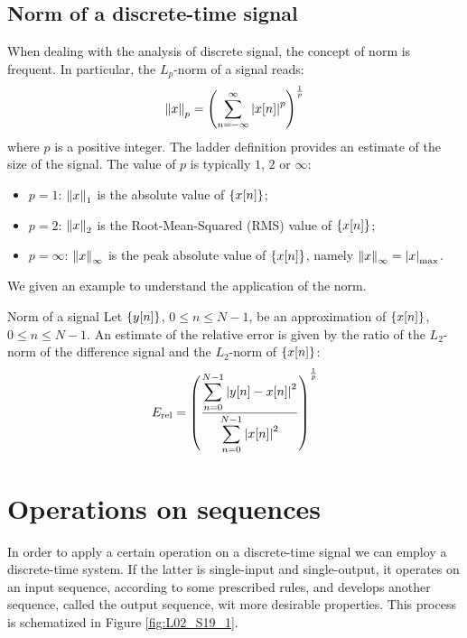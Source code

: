 \documentclass[../../main/main.tex]{subfiles}
\begin{document}
\subsection{Norm of a discrete-time signal}
When dealing with the analysis of discrete signal, the concept of norm is frequent.
In particular, the \( L_{p} \)-norm of a signal reads:
\begin{equation}
    \norm{x}_{p}
    =
    \qty(\sum_{n = -\infty}^{\infty} \abs{x[n]}^{p})^{\frac{1}{p}}
    \label{eq:L02_S17_1}
\end{equation}
where \( p \) is a positive integer. The ladder definition provides an estimate of the size of the signal. The value of \( p \) is typically \( 1 \), \( 2 \) or \( \infty \):
\begin{itemize}
    \item \( p = 1 \): \( \norm{x}_{1} \) is the absolute value of \( \qty{x[n]} \);
    \item \( p = 2 \): \( \norm{x}_{2} \) is the Root-Mean-Squared (RMS) value of \( \qty{x[n]} \);
    \item \( p = \infty \): \( \norm{x}_{\infty} \) is the peak absolute value of \( \qty{x[n]} \), namely \( \norm{x}_{\infty} = \abs{x}_{\mathrm{max}} \).
\end{itemize}
We given an example to understand the application of the norm.

\begin{example}{Norm of a signal}{}
    Let \( \qty{y[n]} \), \( 0 \le n \le N-1 \), be an approximation of \( \qty{x[n]} \), \( 0 \le n \le N-1 \).
    An estimate of the relative error is given by the ratio of the \( L_{2} \)-norm of the difference signal and the \( L_{2} \)-norm of \( \qty{x[n]} \):
    \begin{equation}
        E_{\mathrm{rel}}
        =
        \qty(
            \frac{
                \displaystyle \sum_{n=0}^{N-1} \abs{y[n] - x[n]}^{2}
            }{
                \displaystyle \sum_{n=0}^{N-1} \abs{x[n]}^{2}
            }
        )^{\frac{1}{p}}
        \label{eq:L02_S18_1}
    \end{equation}
\end{example}





\section{Operations on sequences}
In order to apply a certain operation on a discrete-time signal we can employ a discrete-time system. If the latter is single-input and single-output, it operates on an input sequence, according to some prescribed rules, and develops another sequence, called the output sequence, wit more desirable properties. This process is schematized in Figure \ref{fig:L02_S19_1}.
\end{document}
